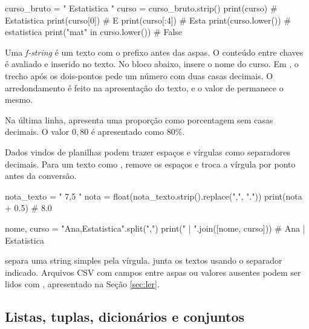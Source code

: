 \begin{exemplo}
curso_bruto = " Estatistica "
curso = curso_bruto.strip()
print(curso)                   # Estatistica
print(curso[0])                # E
print(curso[:4])               # Esta
print(curso.lower())           # estatistica
print("mat" in curso.lower())  # False
\end{exemplo}

Uma \emph{f-string} é um texto com o prefixo  antes das aspas. O conteúdo entre chaves é avaliado e inserido no texto. No bloco abaixo,  insere o nome do curso. Em , o trecho após os dois-pontos pede um número com duas casas decimais. O arredondamento é feito na apresentação do texto, e o valor de  permanece o mesmo.


Na última linha,  apresenta uma proporção como porcentagem sem casas decimais. O valor \(0{,}80\) é apresentado como \(80\%\).

Dados vindos de planilhas podem trazer espaços e vírgulas como separadores decimais. Para um texto como ,  remove os espaços e  troca a vírgula por ponto antes da conversão.

\begin{exemplo}
nota_texto = " 7,5 "
nota = float(nota_texto.strip().replace(",", "."))
print(nota + 0.5)  # 8.0

nome, curso = "Ana,Estatistica".split(",")
print(" | ".join([nome, curso]))  # Ana | Estatistica
\end{exemplo}

 separa uma string simples pela vírgula.  junta os textos usando o separador indicado. Arquivos CSV com campos entre aspas ou valores ausentes podem ser lidos com , apresentado na Seção \ref{sec:ler}.

\subsection{Listas, tuplas, dicionários e conjuntos}

